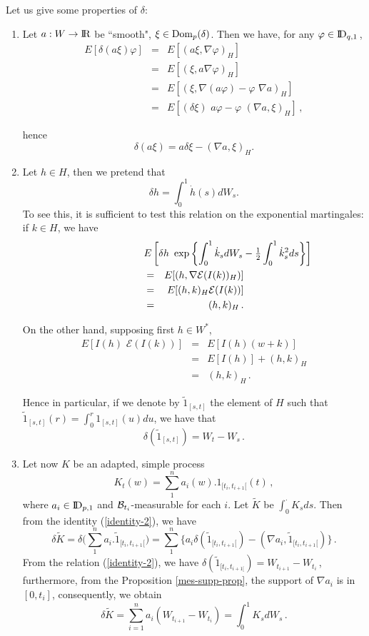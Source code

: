 \documentclass[12pt,a4paper]{book}
\newcommand{\DD}{{\rm I\!D}}
\newcommand{\calB}{{\cal B}}
\newcommand{\R}{{\rm I\!R}}
\newcommand{\Dom}{{\rm Dom}}
\begin{document}
Let us give some properties of $\delta$:
\bigskip
\begin{enumerate}
\item[1.)]
Let $a:W\to\R$ be ``smooth", $\xi\in \Dom_p(\delta)$.
\index[not]{dz@$\Dom_p(\delta)$} Then we have, for any
$\varphi\in \DD_{q,1}\,$,
\begin{eqnarray*}
E\left[\delta(a\xi)\varphi\right] & = & E\left[(a\xi,\nabla\varphi)_H\right] \\
& = & E[(\xi,a\nabla\varphi)_H] \\
& = & E[(\xi,\nabla(a\varphi)-\varphi\,\,\nabla a)_H] \\
& = & E[(\delta\xi)\,\,a\varphi-\varphi\,\,(\nabla a,\xi)_H]\,,
\end{eqnarray*}

\noindent
hence
\begin{equation}
\label{identity-1}
\delta(a\xi)=a\delta\xi-(\nabla a,\xi)_H .
\end{equation}
\item[2.)]
Let $h\in H$, then we pretend that
$$
\delta h=\int_0^1\dot{h}(s)dW_s.
$$
To see this, it is sufficient to test this relation on the exponential
martingales: if $k\in H$, we have
\begin{eqnarray*}
\lefteqn{E\left[\delta h\,\,\exp\left\{\int_0^1\dot{k}_sdW_s-
{\textstyle\frac{1}{2}}\int_0^1\dot{k}_s^2ds\right\}\right]} \\
&=& E[(h,\nabla{\mathcal E}(I(k))_{H})] \\
& =& E[(h,k)_H {\mathcal E}(I(k))] \\
&=& (h,k)_{H}\,.
\end{eqnarray*}

\noindent
On the other hand, supposing first $h\in W^\ast$,
\begin{eqnarray*}
E[I(h)\,\,{\mathcal E}(I(k))] & = & E[I(h)(w+k)] \\
& = & E[I(h)]+(h,k)_{H} \\
& = & (h,k)_{H}\,.
\end{eqnarray*}

\noindent
Hence in particular, if we denote by $\tilde{1}_{[s,t]}$ the element of $H$
such that  $\tilde{1}_{[s,t]}(r)=\int_0^r 1_{[s,t]}(u)du$, we have that
\begin{equation}
\label{identity-2}
\displaystyle \delta(\tilde{1}_{[s,t]})=W_t-W_s\,.
\end{equation}

\item[3.)]
Let now $K$ be an adapted, simple  process
$$
K_t(w)=\sum_1^n a_i(w).1_{[t_i,t_{i+1}[}(t)\,,
$$
where $a_i\in \DD_{p,1}$ and ${\calB}_{t_i}$-measurable for each $i$. Let
$\tilde{K}$ be $\int_0^\cdot K_sds$. Then from  the identity
(\ref{identity-2}), we have
$$
\delta\tilde{K}=
\delta\Big( \sum_1^n a_i.\tilde{1}_{[t_i,t_{i+1}[}\Big)=
\sum_1^n\Big\{ a_i\delta(\tilde{1}_{[t_i,t_{i+1}[})-
(\nabla a_i,\tilde{1}_{[t_i,t_{i+1}[})\Big\}\,.
$$
From the relation (\ref{identity-2}), we have
$\delta(\tilde{1}_{[t_i,t_{i+1[}})=W_{t_{i+1}}-W_{t_i}\,$,
furthermore, from the Proposition \ref{mes-supp-prop}, the support of
$\nabla a_i$ is in $[0,t_i]$, consequently, we obtain
$$
\delta\tilde{K}=\sum_{i=1}^n a_i (W_{t_{i+1}}-W_{t_i})
    =\int_0^1 K_s dW_s\,.
$$
\end{enumerate}
\end{document}
